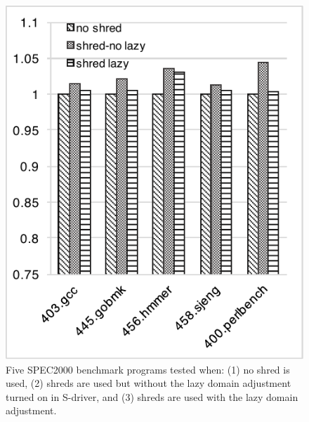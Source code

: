 \begin{figure}[htbp]
\begin{minipage}[b]{0.4\textwidth}
\includegraphics[scale=0.75]{shreds/figures/system_overhead}
\caption{Five SPEC2000 benchmark programs tested when: (1) no shred is used, (2) shreds are used but without the lazy domain adjustment turned on in S-driver, and (3) shreds are used with the lazy domain adjustment. }
\label{fig:sysoverhead}
	\end{minipage}
\end{figure}

%
%




